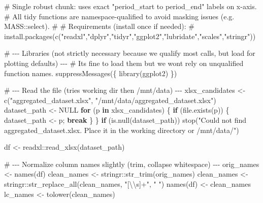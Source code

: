 \documentclass[
  letterpaper,
  DIV=11,
  numbers=noendperiod]{scrartcl}
\newenvironment{Shaded}{\begin{snugshade}}{\end{snugshade}}
\newcommand{\CommentTok}[1]{\textcolor[rgb]{0.37,0.37,0.37}{#1}}
\newcommand{\ConstantTok}[1]{\textcolor[rgb]{0.56,0.35,0.01}{#1}}
\newcommand{\ControlFlowTok}[1]{\textcolor[rgb]{0.00,0.23,0.31}{\textbf{#1}}}
\newcommand{\FunctionTok}[1]{\textcolor[rgb]{0.28,0.35,0.67}{#1}}
\newcommand{\NormalTok}[1]{\textcolor[rgb]{0.00,0.23,0.31}{#1}}
\newcommand{\OtherTok}[1]{\textcolor[rgb]{0.00,0.23,0.31}{#1}}
\newcommand{\SpecialCharTok}[1]{\textcolor[rgb]{0.37,0.37,0.37}{#1}}
\newcommand{\StringTok}[1]{\textcolor[rgb]{0.13,0.47,0.30}{#1}}
\begin{document}
\begin{Shaded}
\begin{Highlighting}[]
\CommentTok{\# Single robust chunk: uses exact "period\_start to period\_end" labels on x{-}axis.}
\CommentTok{\# All tidy functions are namespace{-}qualified to avoid masking issues (e.g. MASS::select).}
\CommentTok{\#}
\CommentTok{\# Requirements (install once if needed):}
\CommentTok{\# install.packages(c("readxl","dplyr","tidyr","ggplot2","lubridate","scales","stringr"))}

\CommentTok{\# {-}{-}{-} Libraries (not strictly necessary because we qualify most calls, but load for plotting defaults) {-}{-}{-}}
\CommentTok{\# It\textquotesingle{}s fine to load them but we won\textquotesingle{}t rely on unqualified function names.}
\FunctionTok{suppressMessages}\NormalTok{(\{}
  \FunctionTok{library}\NormalTok{(ggplot2)}
\NormalTok{\})}

\CommentTok{\# {-}{-}{-} Read the file (tries working dir then /mnt/data) {-}{-}{-}}
\NormalTok{xlsx\_candidates }\OtherTok{\textless{}{-}} \FunctionTok{c}\NormalTok{(}\StringTok{"aggregated\_dataset.xlsx"}\NormalTok{, }\StringTok{"/mnt/data/aggregated\_dataset.xlsx"}\NormalTok{)}
\NormalTok{dataset\_path }\OtherTok{\textless{}{-}} \ConstantTok{NULL}
\ControlFlowTok{for}\NormalTok{ (p }\ControlFlowTok{in}\NormalTok{ xlsx\_candidates) \{}
  \ControlFlowTok{if}\NormalTok{ (}\FunctionTok{file.exists}\NormalTok{(p)) \{ dataset\_path }\OtherTok{\textless{}{-}}\NormalTok{ p; }\ControlFlowTok{break}\NormalTok{ \}}
\NormalTok{\}}
\ControlFlowTok{if}\NormalTok{ (}\FunctionTok{is.null}\NormalTok{(dataset\_path)) }\FunctionTok{stop}\NormalTok{(}\StringTok{"Could not find aggregated\_dataset.xlsx. Place it in the working directory or /mnt/data/"}\NormalTok{)}

\NormalTok{df }\OtherTok{\textless{}{-}}\NormalTok{ readxl}\SpecialCharTok{::}\FunctionTok{read\_xlsx}\NormalTok{(dataset\_path)}

\CommentTok{\# {-}{-}{-} Normalize column names slightly (trim, collapse whitespace) {-}{-}{-}}
\NormalTok{orig\_names }\OtherTok{\textless{}{-}} \FunctionTok{names}\NormalTok{(df)}
\NormalTok{clean\_names }\OtherTok{\textless{}{-}}\NormalTok{ stringr}\SpecialCharTok{::}\FunctionTok{str\_trim}\NormalTok{(orig\_names)}
\NormalTok{clean\_names }\OtherTok{\textless{}{-}}\NormalTok{ stringr}\SpecialCharTok{::}\FunctionTok{str\_replace\_all}\NormalTok{(clean\_names, }\StringTok{"[}\SpecialCharTok{\textbackslash{}\textbackslash{}}\StringTok{s]+"}\NormalTok{, }\StringTok{" "}\NormalTok{)}
\FunctionTok{names}\NormalTok{(df) }\OtherTok{\textless{}{-}}\NormalTok{ clean\_names}
\NormalTok{lc\_names }\OtherTok{\textless{}{-}} \FunctionTok{tolower}\NormalTok{(clean\_names)}


\end{Highlighting}
\end{Shaded}
\end{document}
